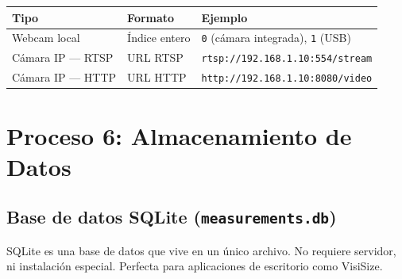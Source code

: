 \documentclass[12pt, a4paper]{article}
\begin{document}
\begin{center}
\begin{tabularx}{\textwidth}{llX}
\toprule
\textbf{Tipo} & \textbf{Formato} & \textbf{Ejemplo} \\
\midrule
Webcam local & Índice entero & \texttt{0} (cámara integrada), \texttt{1} (USB) \\
Cámara IP — RTSP & URL RTSP & \texttt{rtsp://192.168.1.10:554/stream} \\
Cámara IP — HTTP & URL HTTP & \texttt{http://192.168.1.10:8080/video} \\
\bottomrule
\end{tabularx}
\end{center}

\section{Proceso 6: Almacenamiento de Datos}

\subsection{Base de datos SQLite (\texttt{measurements.db})}

SQLite es una base de datos que vive en un único archivo.
No requiere servidor, ni instalación especial. Perfecta para
aplicaciones de escritorio como VisiSize.
\end{document}
